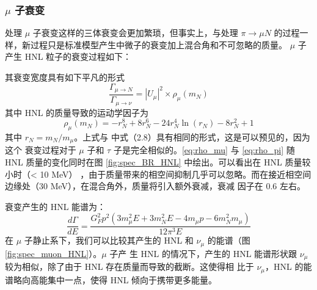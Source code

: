 \documentclass[UTF8]{ctexart}
\begin{document}
\subsubsection{$\mu$ 子衰变}
处理 $\mu$ 子衰变这样的三体衰变会更加繁琐，但事实上，与处理 $\pi \to \mu N$ 的过程一样，新过程只是标准模型产生中微子的衰变加上混合角和不可忽略的质量。
$\mu$ 子产生 HNL 粒子的衰变过程如下：
\begin{center}
\end{center}
其衰变宽度具有如下平凡的形式
\begin{equation}
  \frac{\Gamma_{\mu \to N}}{\Gamma_{\mu \to \nu}} = |U_{\mu}|^2 \times \rho_\mu(m_N) 
\end{equation}
其中 HNL 的质量导致的运动学因子为
\begin{equation}
   \rho_\mu(m_N) = - r_N^8 + 8 r_N^6 - 24 r_N^4 \ln(r_N) - 8 r_N^2 + 1 \label{eq:rho_mu}
\end{equation}
其中 $r_N = m_N / m_\mu$。上式与 \cite{Bondarenko_2018} 中式（2.8）具有相同的形式，这是可以预见的，因为这个
衰变过程对于 $\mu$ 子和 $\tau$ 子是完全相似的。\ref{eq:rho_mu} 与 \ref{eq:rho_pi} 随 HNL 质量的变化同时在图
\ref{fig:spec_BR_HNL} 中绘出。可以看出在 HNL 质量较小时（< 10 MeV）
，由于质量带来的相空间抑制几乎可以忽略。而在接近相空间边缘处（30 MeV），在混合角外，质量将引入额外衰减，衰减
因子在 0.6 左右。

衰变产生的 HNL 能谱为：
\begin{equation}
  \frac{d\Gamma}{dE} = \frac{G_F^2 p^2 (3 m_\mu^2 E + 3 m_N^2 E - 4 m_\mu p - 6 m_N^2 m_\mu)}{12 \pi^3 E}
\end{equation}
在 $\mu$ 子静止系下，我们可以比较其产生的 HNL 和 $\nu_\mu$ 的能谱（图\ref{fig:spec_muon_HNL}）。$\mu$ 子产
生 HNL 的情况下，产生的 HNL 能谱形状跟 $\nu_\mu$ 较为相似，除了由于 HNL 存在质量而导致的截断。这使得相
比于 $\nu_\mu$，HNL 的能谱略向高能集中一点，使得 HNL 倾向于携带更多能量。
\end{document}
